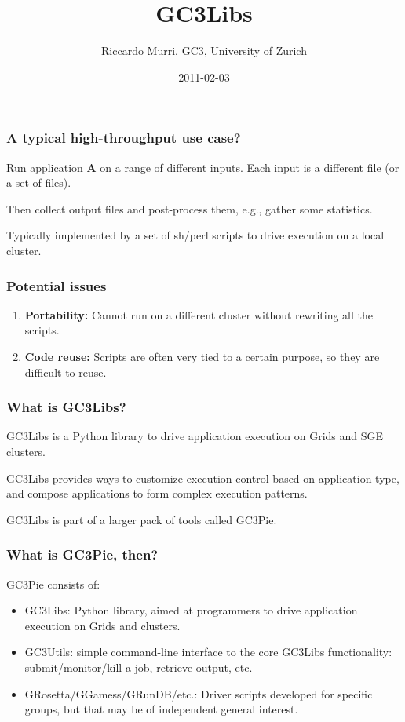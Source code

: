 \documentclass[presentation]{beamer}
\begin{document}
\title{GC3Libs}
\author{Riccardo Murri, GC3, University of Zurich}
\date{2011-02-03}
\maketitle





\begin{frame}
\frametitle{A typical high-throughput use case?}
\label{sec-1}


  Run application \textbf{A} on a range of different inputs.
  Each input is a different file (or a set of files).

  Then collect output files and post-process them, e.g., gather some
  statistics.

  Typically implemented by a set of sh/perl scripts to drive execution
  on a local cluster.
\end{frame}
\begin{frame}
\frametitle{Potential issues}
\label{sec-2}


\begin{enumerate}
\item \textbf{Portability:} Cannot run on a different cluster without rewriting
   all the scripts.
\item \textbf{Code reuse:} Scripts are often very tied to a certain purpose, so
   they are difficult to reuse.
\end{enumerate}
\end{frame}
\begin{frame}
\frametitle{What is GC3Libs?}
\label{sec-3}


  GC3Libs is a Python library to drive application execution on Grids
  and SGE clusters.

  GC3Libs provides ways to customize execution control based on
  application type, and compose applications to form complex execution
  patterns.

  GC3Libs is part of a larger pack of tools called GC3Pie.
  
\end{frame}
\begin{frame}
\frametitle{What is GC3Pie, then?}
\label{sec-4}

  GC3Pie consists of:

\begin{itemize}
\item GC3Libs: Python library, aimed at programmers to drive application
    execution on Grids and clusters.
\item GC3Utils: simple command-line interface to the core GC3Libs
    functionality: submit/monitor/kill a job, retrieve output, etc.
\item GRosetta/GGamess/GRunDB/etc.: Driver scripts developed for
    specific groups, but that may be of independent general interest.
\end{itemize}
\end{frame}
\end{document}
